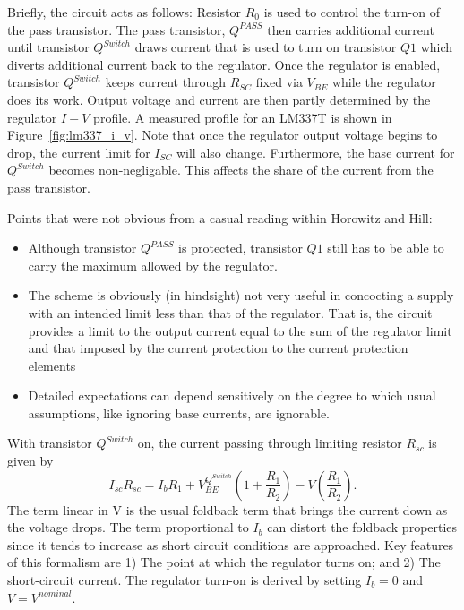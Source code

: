 \documentclass{article}
\begin{document}
Briefly, the circuit acts as follows: Resistor $R_0$ is used to control the 
turn-on of the pass transistor. The pass transistor, $Q^{PASS}$ then carries additional current until transistor $Q^{Switch}$ draws current that is used to turn on transistor $Q1$ which diverts additional current back to the regulator. Once the regulator is enabled, transistor $Q^{Switch}$ keeps current through $R_{SC}$ fixed via $V_{BE}$ while the regulator does its work. 
Output voltage and current are then partly determined by the regulator $I-V$ profile. 
A measured profile for an LM337T is shown in 
Figure~\ref{fig:lm337_i_v}. 
Note that once the regulator output voltage begins to drop, the current limit for $I_{SC}$ will also change. Furthermore, the base current for $Q^{Switch}$ becomes non-negligable. This affects the share of the current from the pass transistor. 

Points that were not obvious from a casual reading within Horowitz and Hill:
\begin{itemize}
\item{Although transistor $Q^{PASS}$ is protected, transistor $Q1$ still has to be able to carry the maximum allowed by the regulator.}
\item{The scheme is obviously (in hindsight) not very useful in concocting a supply with an intended limit less than that of the regulator. That is, the circuit provides a limit to the output current equal to the sum of the regulator limit and that imposed by the current protection to the current protection elements}
\item{Detailed expectations can depend sensitively on the degree to which usual assumptions, like ignoring base currents, are ignorable.}
\end{itemize}
With transistor $Q^{Switch}$ on, the current passing through limiting resistor $R_{sc}$ is given by
$$
I_{sc}R_{sc}=
I_b R_1 + 
V_{BE}^{Q^{Switch}} (1+\frac{R_1}{R_2})-
V(\frac{R_1}{R_2}).
$$
The term linear in V is the usual foldback term that brings the current 
down as the voltage drops.
The term proportional to $I_b$ can distort the foldback properties since 
it tends to increase as short circuit conditions are approached. 
Key features of this formalism are 1) The point at which 
the regulator turns on; and 2) 
The short-circuit current. The regulator turn-on is derived by 
setting $I_b = 0$ and $V=V^{nominal}$.
\end{document}
